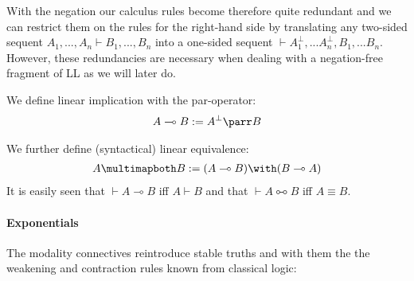 \documentclass[DIN, pagenumber=false, fontsize=11pt, parskip=half, colorinlistoftodos, svgnames]{scrartcl}
\begin{document}
	With the negation our calculus rules become therefore quite redundant and we can restrict them on the rules for the right-hand side by translating any two-sided sequent 
	$A_1, ..., A_n \vdash B_1, ..., B_n$ 
	into a one-sided sequent 
	$\vdash A_1^\bot, ... A_n^\bot, B_1, ... B_n$. 
	However, these redundancies are necessary when dealing with a negation-free fragment of LL as we will later do.
	
	
	\begin{definition}
		We define linear implication with the par-operator: 
		\begin{align*}
			A \multimap B := A^\bot \parr B
		\end{align*}
		
		We further define (syntactical) linear equivalence:
		\begin{align*}
			A \multimapboth B := (A \multimap B) \with (B \multimap A)
		\end{align*}
		It is easily seen that $\vdash A\multimap B$ iff $A \vdash B$ and that $\vdash A \multimapboth B$ iff $A \equiv B$. 
	\end{definition}
	
	\paragraph{Exponentials }
	The modality connectives reintroduce stable truths and with them the the weakening and contraction rules known from classical logic:
	
\end{document}
